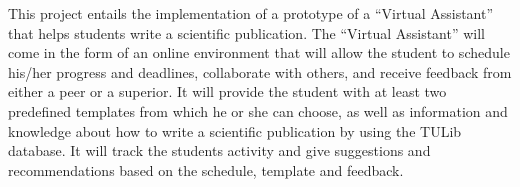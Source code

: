 This project entails the implementation of a prototype of a ``Virtual Assistant'' that helps students write a scientific publication.
The ``Virtual Assistant'' will come in the form of an online environment that will allow the student to schedule his/her progress 
and deadlines, collaborate with others, and receive feedback from either a peer or a superior. 
It will provide the student with at least two predefined templates from which he or she can choose, as well as information and knowledge
about how to write a scientific publication by using the TULib database. It will track the students activity
and give suggestions and recommendations based on the schedule, template and feedback.
